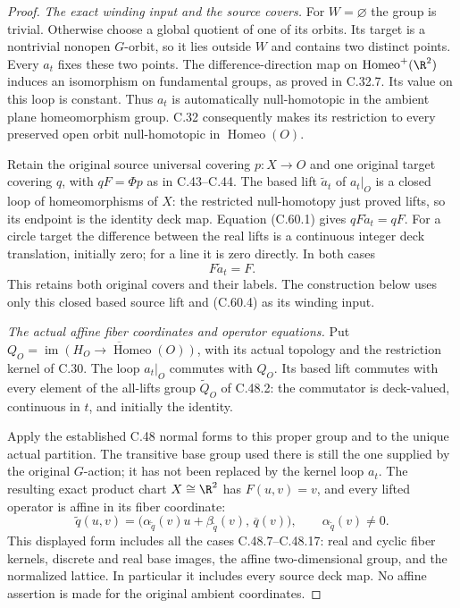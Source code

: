 \begin{proof}
\emph{The exact winding input and the source covers.}
For $W=\varnothing$ the group is trivial.
Otherwise choose a global quotient of one of its
orbits. Its target is a nontrivial nonopen $G$-orbit,
so it lies outside $W$ and contains two distinct
points. Every $a_t$ fixes these two points.
The difference-direction map on
$\operatorname{Homeo}^+(\R^2)$ induces an isomorphism
on fundamental groups, as proved in C.32.7.
Its value on this loop is constant. Thus $a_t$ is
automatically null-homotopic in the ambient plane
homeomorphism group.
C.32 consequently makes its restriction to every
preserved open orbit null-homotopic in
$\operatorname{Homeo}(O)$.

Retain the original source universal covering
$p:X\to O$ and one original target covering $q$,
with $qF=\Phi p$ as in C.43--C.44.
The based lift $\widetilde a_t$ of $a_t|_O$ is a
closed loop of homeomorphisms of $X$:
the restricted null-homotopy just proved lifts,
so its endpoint is the identity deck map.
Equation (C.60.1) gives
$qF\widetilde a_t=qF$.
For a circle target the difference between the real
lifts is a continuous integer deck translation,
initially zero; for a line it is zero directly.
In both cases
\[
                         F\widetilde a_t=F.             \tag{C.60.4}
\]
This retains both original covers and their labels.
The construction below uses only this closed based
source lift and (C.60.4) as its winding input.

\emph{The actual affine fiber coordinates and operator equations.}
Put $Q_O=\overline{\operatorname{im}
(H_O\to\operatorname{Homeo}(O))}$, with its actual
topology and the restriction kernel of C.30.
The loop $a_t|_O$ commutes with $Q_O$.
Its based lift commutes with every element of the
all-lifts group $\widetilde Q_O$ of C.48.2:
the commutator is deck-valued, continuous in $t$,
and initially the identity.

Apply the established C.48 normal forms to this
proper group and to the unique actual partition.
The transitive base group used there is still the
one supplied by the original $G$-action; it has
not been replaced by the kernel loop $a_t$.
The resulting exact product chart $X\cong\R^2$
has $F(u,v)=v$, and every lifted operator is affine
in its fiber coordinate:
\[
 \widetilde q(u,v)=
   \bigl(\alpha_{\widetilde q}(v)u+
         \beta_{\widetilde q}(v),\,\overline q(v)\bigr),
                  \qquad \alpha_{\widetilde q}(v)\ne0. \tag{C.60.5}
\]
This displayed form includes all the cases
C.48.7--C.48.17: real and cyclic fiber kernels,
discrete and real base images, the affine
two-dimensional group, and the normalized lattice.
In particular it includes every source deck map.
No affine assertion is made for the original
ambient coordinates.


\end{proof}
